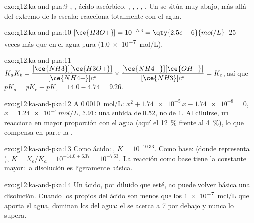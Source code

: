 \begin{solution}{exo:g12:ka-and-pka:9}
, , ácido ascórbico, , ,
, , . Un  se sitúa muy abajo,
más allá del extremo de la escala: reacciona totalmente con el agua.
\end{solution}

\begin{solution}{exo:g12:ka-and-pka:10}
$[\ce{H3O+}] = 10^{-5.6} = \qty{2.5e-6}{mol/L}$, 25 veces más que en el
agua pura (\qty{1.0e-7}{mol/L}).
\end{solution}

\begin{solution}{exo:g12:ka-and-pka:11}
$K_a K_b = \dfrac{[\ce{NH3}][\ce{H3O+}]}{[\ce{NH4+}]c^\circ} \times
\dfrac{[\ce{NH4+}][\ce{OH-}]}{[\ce{NH3}]c^\circ} = K_e$, así que
$pK_a = pK_e - pK_b = 14.0 - 4.74 = 9.26$.
\end{solution}

\begin{solution}{exo:g12:ka-and-pka:12}
A \qty{0.0010}{mol/L}: $x^2 + \num{1.74e-5}\,x - \num{1.74e-8} = 0$,
$x = \qty{1.24e-4}{mol/L}$,  3.91: una subida de 0.52, no de 1. Al
diluirse, un  reacciona en mayor proporción con el agua (aquí
el \qty{12}{\percent} frente al \qty{4}{\percent}), lo que compensa en
parte la .
\end{solution}

\begin{solution}{exo:g12:ka-and-pka:13}
Como ácido: , $K = 10^{-10.33}$.
Como base:  (donde  representa ), $K = K_e/K_a = 10^{-14.0+6.37}
= 10^{-7.63}$. La reacción como base tiene la constante mayor: la
disolución es ligeramente básica.
\end{solution}

\begin{solution}{exo:g12:ka-and-pka:14}
Un ácido, por diluido que esté, no puede volver básica una disolución.
Cuando los  propios del ácido son menos que los
\qty{1e-7}{mol/L} que aporta el agua, dominan los  del agua: el 
se acerca a 7 por debajo y nunca lo supera.
\end{solution}

